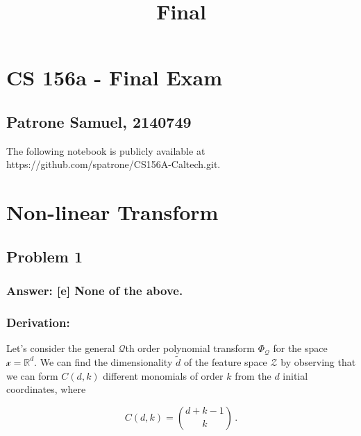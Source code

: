 \documentclass[11pt]{article}
\title{Final}
\begin{document}
    
    \maketitle
    
    

    
    \hypertarget{cs-156a---final-exam}{%
\section{CS 156a - Final Exam}\label{cs-156a---final-exam}}

\hypertarget{patrone-samuel-2140749}{%
\subsection{Patrone Samuel, 2140749}\label{patrone-samuel-2140749}}

The following notebook is publicly available at
https://github.com/spatrone/CS156A-Caltech.git.

    \hypertarget{non-linear-transform}{%
\section{Non-linear Transform}\label{non-linear-transform}}

\hypertarget{problem-1}{%
\subsection{Problem 1}\label{problem-1}}

\hypertarget{answer-e-none-of-the-above.}{%
\subsubsection{Answer: {[}e{]} None of the
above.}\label{answer-e-none-of-the-above.}}

\hypertarget{derivation}{%
\subsubsection{Derivation:}\label{derivation}}

Let's consider the general \(\mathcal{Q}\)th order polynomial transform
\(\Phi_\mathcal{Q}\) for the space \(\mathcal{x}=\mathbb{R}^d\). We can
find the dimensionality \(\tilde{d}\) of the feature space
\(\mathcal{Z}\) by observing that we can form \(C(d,k)\) different
monomials of order \(k\) from the \(d\) initial coordinates, where

\begin{equation}
C(d,k)={d+k-1 \choose k}\,.
\end{equation}
\end{document}

